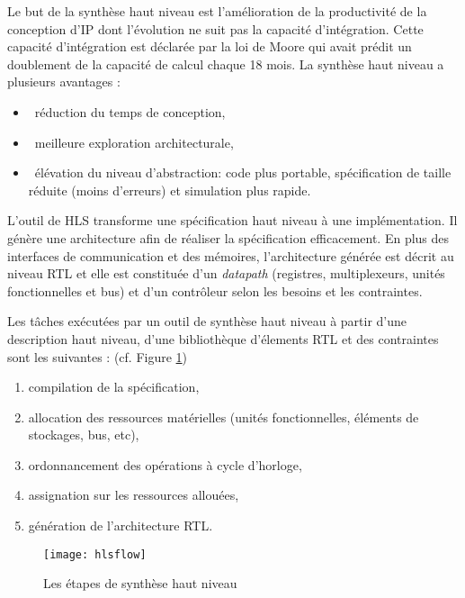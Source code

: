 Le but de la synthèse haut niveau est l'amélioration de la productivité de la conception 
d'IP dont l'évolution ne suit pas la capacité d'intégration\cite{mullercours}. Cette capacité d'intégration
est déclarée par la loi de Moore qui avait prédit un doublement de la capacité de calcul chaque 18 mois.
La synthèse haut niveau a plusieurs avantages :
\begin{itemize}
	\item\ réduction du temps de conception,
	\item\ meilleure exploration architecturale,
	\item\ élévation du niveau d'abstraction: code plus portable, spécification de taille réduite (moins d'erreurs) et simulation plus rapide.
\end{itemize}

L'outil de HLS transforme une spécification haut niveau à une implémentation. Il génère une architecture
afin de réaliser la spécification efficacement. En plus des interfaces de communication et des mémoires,
l'architecture générée est décrit au niveau RTL et elle est constituée d'un \emph{datapath} (registres, multiplexeurs,
unités fonctionnelles et bus) et d'un contrôleur selon les besoins et les contraintes.

Les tâches exécutées par un outil de synthèse haut niveau à partir d'une description haut niveau,
d'une bibliothèque d'élements RTL et des contraintes sont les suivantes :
(cf. Figure \ref{fig:hlsflow})

\begin{enumerate}
	\item
	
	compilation de la spécification,
	\item
	
	allocation des ressources matérielles (unités fonctionnelles, éléments de stockages, bus, etc),
	\item
	
	ordonnancement des opérations à cycle d'horloge,
	\item
	
	assignation sur les ressources allouées,
	 \item
	
	génération de l'architecture RTL.
\end{enumerate}

\begin{figure}[h]
	\centering
	\texttt{[image: hlsflow]}
	\caption{Les étapes de synthèse haut niveau\cite{Coussy2009}}
	\label{fig:hlsflow}
	\vspace{-2mm}
\end{figure}

